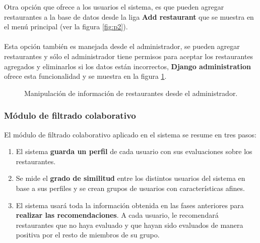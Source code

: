 \documentclass[12pt,letterpaper,oneside] {memoir}
\begin{document}
Otra opción que ofrece a los usuarios el sistema, es que pueden agregar restaurantes a la base de datos desde la liga \textbf{Add restaurant}  que se muestra en el menú principal (ver la figura \ref{fig:p2}).
\paragraph{}
Esta opción también es manejada desde el administrador, se pueden agregar restaurantes y sólo el administrador tiene permisos para aceptar los restaurantes agregados y eliminarlos si los datos están incorrectos, \textbf{Django administration} ofrece esta funcionalidad y se muestra en la figura \ref{fig:p7}.

\begin{figure}[H]
\centering 
{} \caption{Manipulación de información de restaurantes desde el administrador.} 
\label{fig:p7} 
\end{figure}


\subsubsection{Módulo de filtrado colaborativo}

El módulo de filtrado colaborativo aplicado en el sistema \citep{PerezCordon2008} se resume en tres pasos:
\begin{enumerate}
\item El sistema \textbf{guarda un perfil} de cada usuario con sus evaluaciones sobre los restaurantes.
\item Se mide el \textbf{grado de similitud} entre los distintos usuarios del sistema en base a sus perfiles y se crean grupos de usuarios con características afines.
\item El sistema usará toda la información obtenida en las fases anteriores para \textbf{realizar las recomendaciones}. A cada usuario, le recomendará restaurantes que no haya evaluado y que hayan sido evaluados de manera positiva por el resto de miembros de su grupo.
\end{enumerate}
\end{document}

